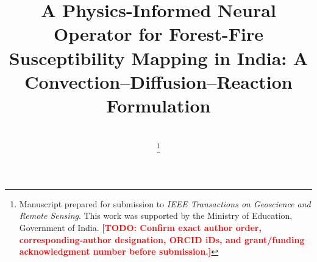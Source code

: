 \documentclass[journal]{IEEEtran}
\newcommand{\todo}[1]{\textcolor{red}{\textbf{[TODO: #1]}}}
\begin{document}
\title{A Physics-Informed Neural Operator for Forest-Fire Susceptibility Mapping in India: A Convection--Diffusion--Reaction Formulation}

\author{
\\
\thanks{Manuscript prepared for submission to \emph{IEEE Transactions on Geoscience and Remote Sensing}. This work was supported by the Ministry of Education, Government of India. \todo{Confirm exact author order, corresponding-author designation, ORCID iDs, and grant/funding acknowledgment number before submission.}}
}

\maketitle
\end{document}
